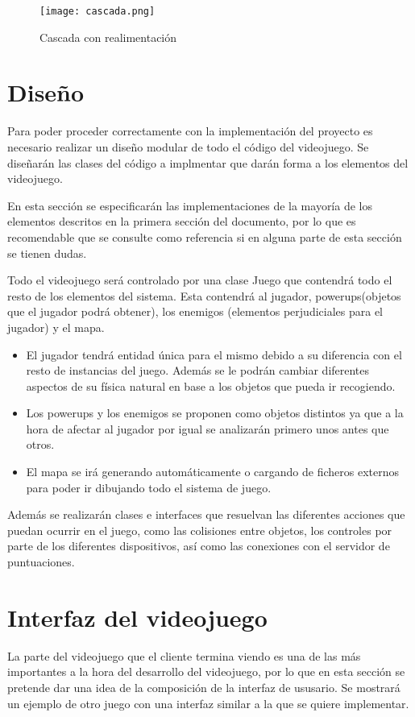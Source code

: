 \documentclass[palatino]{apuntes}
\begin{document}
\begin{figure}[hbtp]
    \centering
    \texttt{[image: cascada.png]}
    \caption{Cascada con realimentación}
    \label{fig:cascadarealimentacion}
\end{figure}





\section{Diseño}

Para poder proceder correctamente con la implementación del proyecto es necesario realizar un diseño modular de todo el código del videojuego. Se diseñarán las clases del código a implmentar que darán forma a los elementos del videojuego.

En esta sección se especificarán las implementaciones de la mayoría de los elementos descritos en la primera sección del documento, por lo que es recomendable que se consulte como referencia si en alguna parte de esta sección se tienen dudas.

Todo el videojuego será controlado por una clase Juego que contendrá todo el resto de los elementos del sistema. Esta contendrá al jugador, powerups(objetos que el jugador podrá obtener), los enemigos (elementos perjudiciales para el jugador) y el mapa.

\begin{itemize}
	\item El jugador tendrá entidad única para el mismo debido a su diferencia con el resto de instancias del juego. Además se le podrán cambiar diferentes aspectos de su física natural en base a los objetos que pueda ir recogiendo.
	\item Los powerups y los enemigos se proponen como objetos distintos ya que a la hora de afectar al jugador por igual se analizarán primero unos antes que otros.
	\item El mapa se irá generando automáticamente o cargando de ficheros externos para poder ir dibujando todo el sistema de juego.
\end{itemize}

Además se realizarán clases e interfaces que resuelvan las diferentes acciones que puedan ocurrir en el juego, como las colisiones entre objetos, los controles por parte de los diferentes dispositivos, así como las conexiones con el servidor de puntuaciones.


\section{Interfaz del videojuego}
La parte del videojuego que el cliente termina viendo es una de las más importantes a la hora del desarrollo del videojuego, por lo que en esta sección se pretende dar una idea de la composición de la interfaz de ususario. Se mostrará un ejemplo de otro juego con una interfaz similar a la que se quiere implementar.
\end{document}
